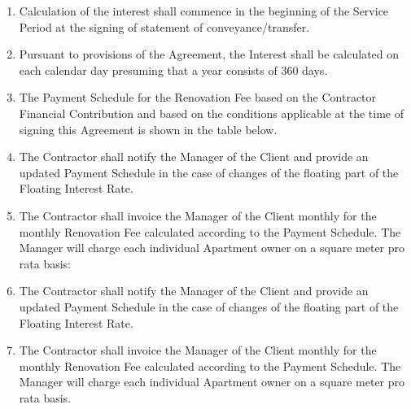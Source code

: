 \begin{enumerate}[label=\arabic*.]
	\item Calculation of the interest shall commence in the beginning of the Service Period at the signing of statement of conveyance/transfer.
	\item Pursuant to provisions of the Agreement, the Interest shall be calculated on each calendar day presuming that a year consists of 360 days.
	\item The Payment Schedule for the Renovation Fee based on the Contractor Financial Contribution and based on the conditions applicable at the time of signing this Agreement is shown in the table below.
	\item The Contractor shall notify the Manager of the Client and provide an updated Payment Schedule in the case of changes of the floating part of the Floating Interest Rate.
	\item The Contractor shall invoice the Manager of the Client monthly for the monthly Renovation Fee calculated according to the Payment Schedule. The Manager will charge each individual Apartment owner on a square meter pro rata basis:


\begin{center}
\end{center}

	\item The Contractor shall notify the Manager of the Client and provide an updated Payment Schedule in the case of changes of the floating part of the Floating Interest Rate.
	\item The Contractor shall invoice the Manager of the Client monthly for the monthly Renovation Fee calculated according to the Payment Schedule. The Manager will charge each individual Apartment owner on a square meter pro rata basis.
\end{enumerate}
